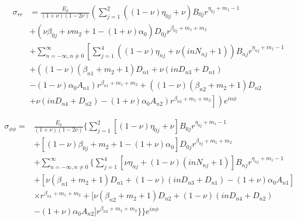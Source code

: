 \begin{equation}
	\label{eq:ch2:equation49}
	\begin{split}
	\sigma_{rr} &= \frac{E_0}{\left (1+\nu \right ) \left (1-2\nu \right)} \left ( \sum_{j=1}^2 \left (\left (1-\nu \right ) \eta_{0j}  +\nu \right ) B_{0j} r^{\eta_{0j}+m_1-1} \right.
	\\
	&+ \left (\nu \beta_{0j} + \nu m_2 + 1 - \left (1+\nu \right ) \alpha_0 \right ) D_{0j} r^{\beta_{0j}+m_1+m_2}
	\\
	&\left. + \sum_{n=-\infty, n \ne 0}^{\infty}  \left [ \sum_{j=1}^4 \left (\left (1-\nu \right ) \eta_{nj}  +\nu \left (in N_{nj} +1 \right ) \right ) B_{nj} r^{\eta_{nj}+m_1-1} \right. \right.
	\\
	&\left. \left. + \left ( \left ( 1 - \nu \right )\left ( \beta_{n1} +m_2 + 1 \right )D_{n1}  +\nu \left ( in D_{n3} + D_{n1} \right ) \right. \right. \right.
	\\
	& \left. \left .\left. - \left (1-\nu \right ) \alpha_{0} A_{n1} \right ) r^{\beta_{n1} +m_1+m_2} + \left ( \left (1-\nu \right ) \left (\beta_{n2}+m_2+1 \right ) D_{n2}  \right . \right. \right. 
	\\
	& \left. \left. \left.   +\nu \left (in D_{n4} + D_{n2} \right ) - \left (1+\nu \right ) \alpha_{0} A_{n2} \right ) r^{\beta_{n2} +m_1+m_2} \right ] \right ) e^{in\phi}
	\end{split}
\end{equation}


\begin{equation}
	\label{eq:ch2:equation50}
	\begin{split}
	\sigma_{\phi \phi} =& \frac{E_0}{\left (1+\nu \right ) \left (1-2\nu \right )}
	\Big \{ \sum_{j=1}^2 \left [ \left ( 1 -\nu \right ) \eta_{0j}+\nu \right ] B_{0j}r^{\eta_{0j}+m_1-1}
	\\
	&+ \left [ \left ( 1 -\nu \right ) \beta_{0j}+m_2+1 - \left (1+\nu \right)\alpha_0 \right ]D_{0j} r^{\beta_{0j}+m_1+m_2} \\
	&+  \sum_{n=-\infty, n\ne 0}^{\infty} \big\{  \sum_{j=1}^4 \left [ \nu \eta_{nj}+ \left ( 1 -\nu \right ) \left ( in N_{nj}+1 \right ) \right ]  B_{nj} r^{\eta_{nj}+m_1-1}
	\\
	&+ \left [ \nu \left ( \beta_{n1}+m_2+1\right ) D_{n1} + \left (1-\nu \right ) \left (inD_{n3}+D_{n1} \right )- \left (1+\nu \right ) \alpha_0A_{n1}\right ]
	\\
	&\times r^{ \beta_{n1}+m_1+m_2} + \Big [ \nu \left (\beta_{n2}+m_2+1 \right ) D_{n2} +\left (1-\nu \right )\left ( in D_{n4}+D_{n2} \right )
	\\
	&- \left (1+\nu \right ) \alpha_0 A_{n2} \Big  ] r^{\beta_{n2}+m_1+m_2} \big\}  \Big \} e^{in\phi}
	\end{split}
\end{equation}


